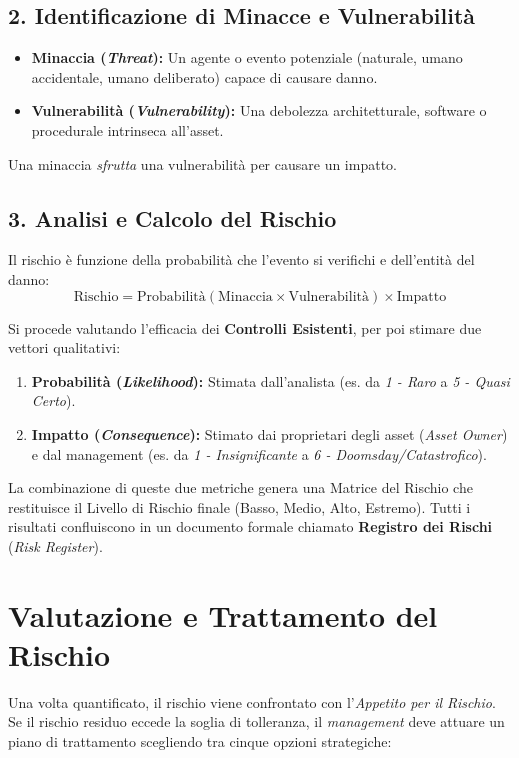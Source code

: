 \subsection{2. Identificazione di Minacce e Vulnerabilità}
\begin{itemize}
    \item \textbf{Minaccia (\textit{Threat}):} Un agente o evento potenziale (naturale, umano accidentale, umano deliberato) capace di causare danno.
    \item \textbf{Vulnerabilità (\textit{Vulnerability}):} Una debolezza architetturale, software o procedurale intrinseca all'asset.
\end{itemize}
Una minaccia \textit{sfrutta} una vulnerabilità per causare un impatto.

\subsection{3. Analisi e Calcolo del Rischio}
Il rischio è funzione della probabilità che l'evento si verifichi e dell'entità del danno:
$$ \text{Rischio} = \text{Probabilità} (\text{Minaccia} \times \text{Vulnerabilità}) \times \text{Impatto} $$

Si procede valutando l'efficacia dei \textbf{Controlli Esistenti}, per poi stimare due vettori qualitativi:
\begin{enumerate}
    \item \textbf{Probabilità (\textit{Likelihood}):} Stimata dall'analista (es. da \textit{1 - Raro} a \textit{5 - Quasi Certo}).
    \item \textbf{Impatto (\textit{Consequence}):} Stimato dai proprietari degli asset (\textit{Asset Owner}) e dal management (es. da \textit{1 - Insignificante} a \textit{6 - Doomsday/Catastrofico}).
\end{enumerate}

La combinazione di queste due metriche genera una Matrice del Rischio che restituisce il Livello di Rischio finale (Basso, Medio, Alto, Estremo). Tutti i risultati confluiscono in un documento formale chiamato \textbf{Registro dei Rischi} (\textit{Risk Register}).

\section{Valutazione e Trattamento del Rischio}
Una volta quantificato, il rischio viene confrontato con l'\textit{Appetito per il Rischio}. Se il rischio residuo eccede la soglia di tolleranza, il \textit{management} deve attuare un piano di trattamento scegliendo tra cinque opzioni strategiche:

